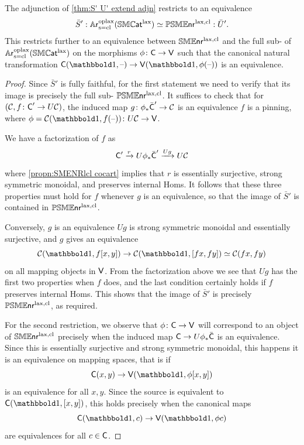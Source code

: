 \documentclass[a4paper,11pt]{article}
\newcommand{\ARoplcl}{\AR^{\oplax}_{\mathrm{s}=\cl}(\SMCATl)}
\begin{document}
\begin{cor}
  The adjunction of \cref{thm:S' U' extend adjn} restricts to an
  equivalence
  \[ \bar{S}' : \ARoplcl \simeq \PSMENRlcl : \bar{U}'.\]
  This restricts further to an equivalence between $\mathbb{SME}\mkern-0.5mu\textsf{\textup{nr}}^{\text{\textup{lax}},\text{\textup{cl}}}$ and the
  full sub-\itcat{} of $\ARoplcl$ on the morphisms $\phi \colon \uC
  \to \uV$ such that the canonical natural transformation $\uC(\bbone, \blank) \to
  \uV(\bbone, \phi(\blank))$ is an equivalence.
\end{cor}
\begin{proof}
  Since $\bar{S}'$ is fully faithful, for the first statement we need
  to verify that its image is precisely the full sub-\itcat{}
  $\mathbb{PSME}\mkern-0.5mu\textsf{\textup{nr}}^{\text{\textup{lax}},\text{\textup{cl}}}$. It suffices to check that for $(\eC, f
  \colon \uC' \to U\eC)$, the induced map $g\colon \phi_{*}\bar{\uC}' \to
  \eC$ is an equivalence \IFF{} $f$ is a pinning, where $\phi =
  \eC(\bbone,f(\blank)) \colon U\eC \to \uV$.

  We have a factorization of $f$ as
  \[ \uC' \xto{r} U\phi_{*}\bar{\uC}' \xto{Ug} U\eC \]
  where \cref{propn:SMENRlcl cocart} implies that $r$ is essentially surjective, strong symmetric
  monoidal, and preserves internal Homs. It follows that these three
  properties must hold for $f$ whenever $g$ is an equivalence, so that
  the image of $\bar{S}'$ is contained in $\mathbb{PSME}\mkern-0.5mu\textsf{\textup{nr}}^{\text{\textup{lax}},\text{\textup{cl}}}$.

  Conversely, $g$ is an
  equivalence
  \IFF{} $Ug$ is strong symmetric 
  monoidal and essentially surjective, and $g$ gives an equivalence
  \[ \eC(\bbone, f[x,y]) \to \eC(\bbone, [fx,fy])\simeq \eC(fx,fy) \]
  on all
  mapping objects in $\textup{\textsf{V}}$. From the factorization above we see that
  $Ug$ has the first two properties when $f$ does, and the last
  condition certainly holds if $f$ preserves
  internal Homs. This shows that the image of $\bar{S}'$ is precisely
  $\mathbb{PSME}\mkern-0.5mu\textsf{\textup{nr}}^{\text{\textup{lax}},\text{\textup{cl}}}$, as required.

  For the second restriction, we observe that $\phi \colon \oC \to
  \oV$ will correspond to an object of $\mathbb{SME}\mkern-0.5mu\textsf{\textup{nr}}^{\text{\textup{lax}},\text{\textup{cl}}}$ precisely when the
  induced map $\oC \to U\phi_{*}\bar{\oC}$ is an equivalence. Since
  this is essentially surjective and strong symmetric monoidal, this
  happens \IFF{} it is an equivalence on mapping spaces, that is if
  \[ \oC(x,y) \to \oV(\bbone,\phi[x,y]) \]
  is an equivalence for all $x,y$. Since the source is equivalent to
  $\oC(\bbone,[x,y])$, this holds precisely when the canonical maps
  \[ \oC(\bbone,c) \to \oV(\bbone, \phi c)\]
  are equivalences for all $c \in \textup{\textsf{C}}$.  
\end{proof}
\end{document}
